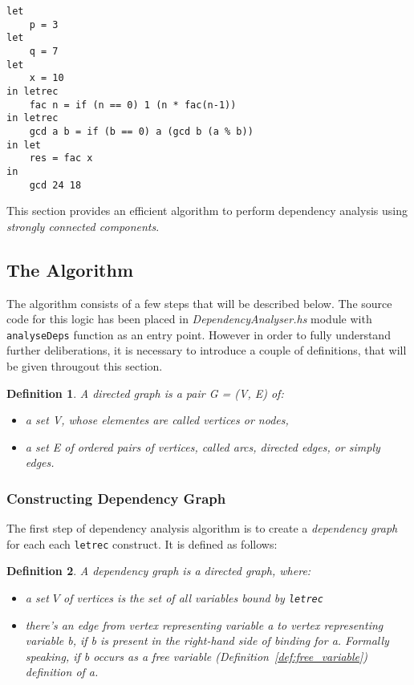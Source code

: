 \documentclass[12pt,a4paper]{report}
\newtheorem{definition}{Definition}[chapter]
\begin{document}
\hspace*{-1.5in}
\begin{lstlisting}[style=haskell,label=lst:letrec_after_anlysis,caption={\texttt{letrec}
  after performing dependency anlysis.}]
let
    p = 3
let
    q = 7
let
    x = 10
in letrec
    fac n = if (n == 0) 1 (n * fac(n-1))
in letrec
    gcd a b = if (b == 0) a (gcd b (a % b))
in let
    res = fac x
in
    gcd 24 18
\end{lstlisting}
This section provides an efficient algorithm to perform dependency analysis
using \textit{strongly connected components}.

\subsection{The Algorithm}
The algorithm consists of a few steps that will be described below. The source
code for this logic has been placed in \textit{DependencyAnalyser.hs} module
with \texttt{analyseDeps} function as an entry point. However in order to fully
understand further deliberations, it is necessary to introduce a couple of
definitions, that will be given througout this section.
\begin{definition}
A directed graph is a pair G = (V, E) of:
\begin{itemize}
  \item a set V, whose elementes are called vertices or nodes,
  \item a set E of ordered pairs of vertices, called arcs, directed edges, or
    simply edges.
\end{itemize}
\end{definition}

\subsubsection{Constructing Dependency Graph}
The first step of dependency analysis algorithm is to create a
\textit{dependency graph} for each each \texttt{letrec} construct. It is
defined as follows:
\begin{definition}
A dependency graph is a directed graph, where:
\begin{itemize}
  \item a set $V$ of vertices is the set of all variables bound by
    \texttt{letrec}
  \item there's an edge from vertex representing variable a to vertex
    representing variable b, if b is present in the right-hand side of
    binding for a. Formally speaking, if b occurs as a free variable
    (Definition~\ref{def:free_variable}) definition of a.
\end{itemize}
\end{definition}
\end{document}
